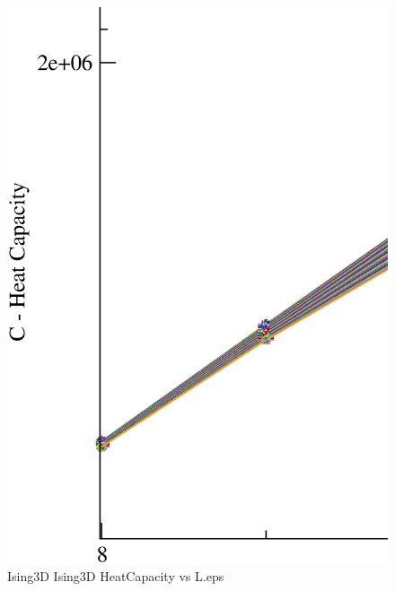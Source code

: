 \begin{figure}[!htpb]
  \centering
  \includegraphics[width=\textwidth]{./plots/Ising3D/Ising3D_HeatCapacity_vs_L.eps}
  \caption{Ising3D Ising3D HeatCapacity vs L.eps}
\end{figure}

